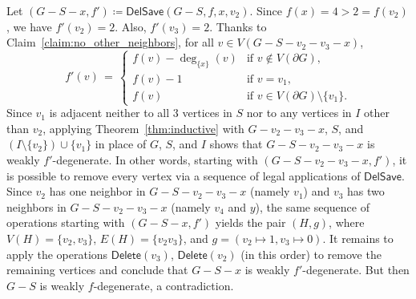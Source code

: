 \documentclass[11pt]{article}
\theoremstyle{slantthm}
\numberwithin{equation}{section}
\theoremstyle{definition}
\renewcommand{\geq}{\geqslant}
\newcommand{\defeq}{\coloneqq}
\numberwithin{equation}{section}
\newcommand{\0}{\varnothing}
\newcommand{\set}[1]{\{#1\}}
\newcommand{\del}{\mathsf{Delete}}
\newcommand{\delsave}{\mathsf{DelSave}}
\newcommand{\bdry}[1]{{\partial #1}}
\begin{document}
    Let $(G - S - x, f') \defeq \delsave(G-S, f, x, v_2)$. Since $f(x) = 4 > 2 = f(v_2)$, we have $f'(v_2) = 2$. Also, $f'(v_3) = 2$. Thanks to Claim~\ref{claim:no_other_neighbors}, for all $v \in V(G - S - v_2 - v_3 - x)$,
        \[
        f'(v) \,=\, \begin{cases}
                    f(v) - \deg_{\set{x}}(v) &\text{if } v \notin V(\bdry{G}),\\
                    f(v) - 1 &\text{if } v = v_1,\\
                    f(v) &\text{if } v \in V(\bdry{G}) \setminus \set{v_1}.
                    \end{cases}
        \]
Since $v_1$ is adjacent neither to all $3$ vertices in $S$ nor to any vertices in $I$ other than $v_2$, applying Theorem~\ref{thm:inductive} with $G - v_2 - v_3 - x$, $S$, and $(I \setminus \set{v_2}) \cup \set{v_1}$ in place of $G$, $S$, and $I$ shows that $G - S - v_2 - v_3 - x$ is weakly $f'$-degenerate.  In other words, starting with $(G - S - v_2 - v_3 - x, f')$, it is possible to remove every vertex via a sequence of legal applications of $\delsave$. Since $v_2$ has one neighbor in $G - S - v_2 - v_3 - x$ (namely $v_1$) and $v_3$ has two neighbors in $G - S - v_2 - v_3 - x$ (namely $v_4$ and $y$), the same sequence of operations starting with $(G - S- x, f')$ yields the pair $(H, g)$, where $V(H) = \set{v_2, v_3}$, $E(H) = \set{v_2 v_3}$, and $g = (v_2 \mapsto 1, v_3 \mapsto 0)$. It remains to apply the operations $\del(v_3)$, $\del(v_2)$ (in this order) to remove the remaining vertices and conclude that $G - S - x$ is weakly $f'$-degenerate. But then $G - S$ is weakly $f$-degenerate, a contradiction.

\end{document}
